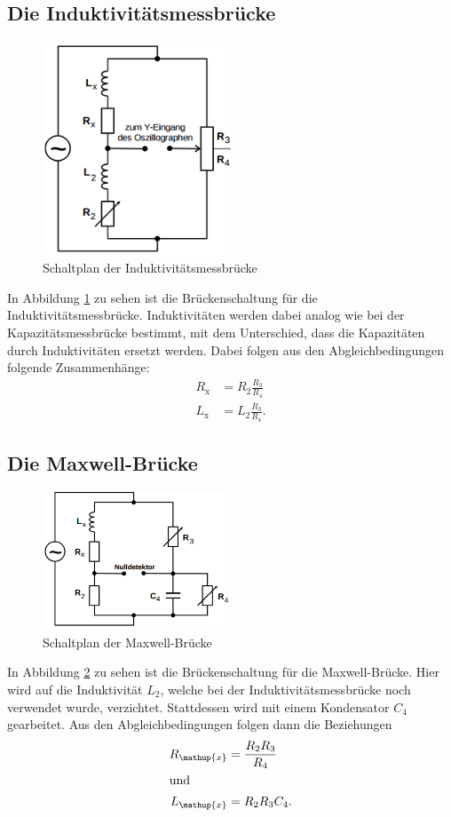 \documentclass[
  bibliography=totoc,     %
  captions=tableheading,  %
  titlepage=firstiscover, %
]{scrartcl}
\begin{document}
\subsection{Die Induktivitätsmessbrücke}
\begin{figure}[htb]
  \centering
  \includegraphics[width=0.5\textwidth]{V3024.png}
  \caption{Schaltplan der Induktivitätsmessbrücke}
  \label{fig:V3024}
\end{figure}
In Abbildung \ref{fig:V3024} zu sehen ist die Brückenschaltung für die
Induktivitätsmessbrücke. Induktivitäten werden dabei analog wie bei der
Kapazitätsmessbrücke bestimmt, mit dem Unterschied, dass die Kapazitäten
durch Induktivitäten ersetzt werden. Dabei folgen aus den Abgleichbedingungen
folgende Zusammenhänge:
\begin{align}
    \label{eq:induktivitätsmessbrücke_R}
    R_{\mathup{x}} &= R_2 \frac{R_3}{R_4} \\
    \label{eq:induktivitätsmessbrücke_L}
    L_{\mathup{x}} &= L_2 \frac{R_3}{R_4}.
\end{align}
\newpage
\subsection{Die Maxwell-Brücke}
\begin{figure}[htb]
  \centering
  \includegraphics[width=0.5\textwidth]{V3025.png}
  \caption{Schaltplan der Maxwell-Brücke}
  \label{fig:V3025}
\end{figure}
In Abbildung \ref{fig:V3025} zu sehen ist die Brückenschaltung für die
Maxwell-Brücke. Hier wird auf die Induktivität $L_2$, welche bei der
Induktivitätsmessbrücke noch verwendet wurde, verzichtet. Stattdessen wird mit
einem Kondensator $C_4$ gearbeitet. Aus den Abgleichbedingungen folgen dann die
Beziehungen
\begin{align}
    \label{eq:maxwell_R}
    R_{\mathup{x}} &= \frac{R_2 R_3}{R_4} \\
    \shortintertext{und}
    \label{eq:maxwell_L}
    L_{\mathup{x}} &= R_2 R_3 C_4.
\end{align}
\end{document}
